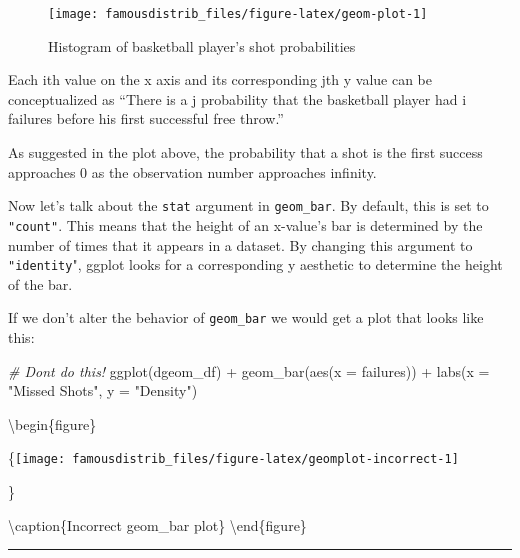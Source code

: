 \documentclass[
]{article}
\newenvironment{Shaded}{\begin{snugshade}}{\end{snugshade}}
\newcommand{\AttributeTok}[1]{\textcolor[rgb]{0.77,0.63,0.00}{#1}}
\newcommand{\CommentTok}[1]{\textcolor[rgb]{0.56,0.35,0.01}{\textit{#1}}}
\newcommand{\FunctionTok}[1]{\textcolor[rgb]{0.00,0.00,0.00}{#1}}
\newcommand{\NormalTok}[1]{#1}
\newcommand{\SpecialCharTok}[1]{\textcolor[rgb]{0.00,0.00,0.00}{#1}}
\newcommand{\StringTok}[1]{\textcolor[rgb]{0.31,0.60,0.02}{#1}}
\begin{document}
\begin{figure}

{\centering \texttt{[image: famousdistrib\_files/figure-latex/geom-plot-1]} 

}

\caption{Histogram of basketball player's shot probabilities}\label{fig:geom-plot}
\end{figure}

Each ith value on the x axis and its corresponding jth y value can be conceptualized as ``There is a j probability that the basketball player had i failures before his first successful free throw.''

As suggested in the plot above, the probability that a shot is the first success approaches 0 as the observation number approaches infinity.

Now let's talk about the \texttt{stat} argument in \texttt{geom\_bar}. By default, this is set to \texttt{"count"}. This means that the height of an x-value's bar is determined by the number of times that it appears in a dataset. By changing this argument to \texttt{"identity}", ggplot looks for a corresponding y aesthetic to determine the height of the bar.

If we don't alter the behavior of \texttt{geom\_bar} we would get a plot that looks like this:

\begin{Shaded}
\begin{Highlighting}[]
\CommentTok{\# Don\textquotesingle{}t do this!}
\FunctionTok{ggplot}\NormalTok{(dgeom\_df) }\SpecialCharTok{+}
  \FunctionTok{geom\_bar}\NormalTok{(}\FunctionTok{aes}\NormalTok{(}\AttributeTok{x =}\NormalTok{ failures)) }\SpecialCharTok{+}
  \FunctionTok{labs}\NormalTok{(}\AttributeTok{x =} \StringTok{"Missed Shots"}\NormalTok{, }\AttributeTok{y =} \StringTok{"Density"}\NormalTok{)}
\end{Highlighting}
\end{Shaded}

\textbackslash begin\{figure\}

\{\centering \texttt{[image: famousdistrib\_files/figure-latex/geomplot-incorrect-1]}

\}

\textbackslash caption\{Incorrect geom\_bar plot\}\label{fig:geomplot-incorrect}
\textbackslash end\{figure\}

\begin{center}\rule{0.5\linewidth}{0.5pt}\end{center}
\end{document}

